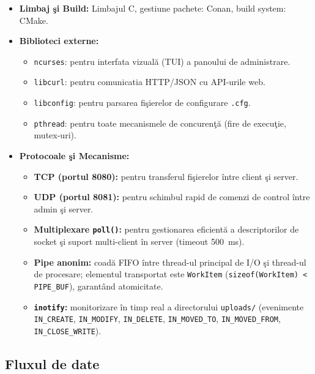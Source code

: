 \documentclass[12pt, a4paper]{article}
\begin{document}
\begin{itemize}
    \item \textbf{Limbaj \c{s}i Build:} Limbajul C, gestiune pachete: Conan, build system: CMake.
    \item \textbf{Biblioteci externe:}
    \begin{itemize}
        \item \texttt{ncurses}: pentru interfata vizual\u{a} (TUI) a panoului de administrare.
        \item \texttt{libcurl}: pentru comunicatia HTTP/JSON cu API-urile web.
        \item \texttt{libconfig}: pentru parsarea fi\c{s}ierelor de configurare \texttt{.cfg}.
        \item \texttt{pthread}: pentru toate mecanismele de concuren\c{t}\u{a} (fire de execu\c{t}ie,
        mutex-uri).
    \end{itemize}
    \item \textbf{Protocoale \c{s}i Mecanisme:}
    \begin{itemize}
        \item \textbf{TCP (portul 8080):} pentru transferul fi\c{s}ierelor \^{i}ntre client \c{s}i server.
        \item \textbf{UDP (portul 8081):} pentru schimbul rapid de comenzi de control \^{i}ntre admin
        \c{s}i server.
        \item \textbf{Multiplexare \texttt{poll()}:} pentru gestionarea eficient\u{a} a descriptorilor
        de socket \c{s}i suport multi-client \^{i}n server (timeout 500~ms).
        \item \textbf{Pipe anonim:} coad\u{a} FIFO \^{i}ntre thread-ul principal de I/O \c{s}i
        thread-ul de procesare; elementul transportat este \texttt{WorkItem}
        (\texttt{sizeof(WorkItem) < PIPE\_BUF}), garantând atomicitate.
        \item \textbf{\texttt{inotify}:} monitorizare \^{i}n timp real a directorului
        \texttt{uploads/} (evenimente \texttt{IN\_CREATE}, \texttt{IN\_MODIFY},
        \texttt{IN\_DELETE}, \texttt{IN\_MOVED\_TO}, \texttt{IN\_MOVED\_FROM},
        \texttt{IN\_CLOSE\_WRITE}).
    \end{itemize}
\end{itemize}

\subsection*{Fluxul de date}
\end{document}
